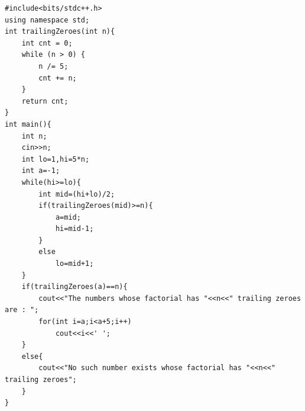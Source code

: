 \documentclass[10pt]{article}
\begin{document}
\begin{lstlisting}
#include<bits/stdc++.h>
using namespace std;
int trailingZeroes(int n){ 
    int cnt = 0; 
    while (n > 0) { 
        n /= 5; 
        cnt += n; 
    } 
    return cnt; 
} 
int main(){
    int n;
    cin>>n;
    int lo=1,hi=5*n;
    int a=-1;
    while(hi>=lo){
        int mid=(hi+lo)/2;
        if(trailingZeroes(mid)>=n){
            a=mid;
            hi=mid-1;
        }
        else
            lo=mid+1;
    }
    if(trailingZeroes(a)==n){
        cout<<"The numbers whose factorial has "<<n<<" trailing zeroes are : ";
        for(int i=a;i<a+5;i++)
            cout<<i<<' ';
    }
    else{
        cout<<"No such number exists whose factorial has "<<n<<" trailing zeroes";
    }
}
\end{lstlisting}
\clearpage

	
\end{document}
